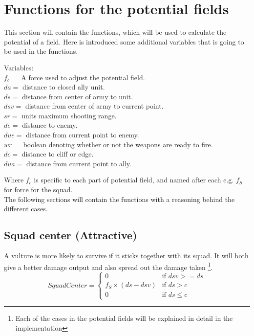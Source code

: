 \section{Functions for the potential fields}
	This section will contain the functions, which will be used to calculate the potential of a field. Here is introduced some additional variables that 
	is going to be used in the functions.
	
	\label{cha3_variables}
	Variables:\\
	$f_c =$ A force used to adjust the potential field.\\
	$da =$ distance to closed ally unit.\\
	$ds =$ distance from center of army to unit.\\
	$dsv =$ distance from center of army to current point.\\
	$sr =$ units maximum shooting range.\\
	$de =$ distance to enemy.\\
	$due =$ distance from current point to enemy.\\
	$wr =$ boolean denoting whether or not the weapons are ready to fire.\\
	$dc =$ distance to cliff or edge. \\
	$dua =$ distance from current point to ally.
	
	Where $f_c$ is specific to each part of potential field, and named after each e.g. $f_{S}$ for force for the squad. \\
	
	The following sections will contain the functions with a reasoning behind the different cases.
	
	\subsection*{Squad center (Attractive)}
		\label{SCA_label}A vulture is more likely to survive if it sticks together with its squad. 
		It will both give a better damage output and also spread out the damage taken
		\footnote{Each of the cases in the potential fields will be explained in detail in the implementation}.
		\begin{displaymath}
			SquadCenter  = \begin{cases}
					0 & \text{if } dsv >= ds\\
					f_{S} \times (ds - dsv) & \text{if } ds > c\\
					0 & \text{if } ds \leq c
				\end{cases}		
		\end{displaymath}
		
